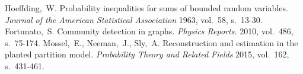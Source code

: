 \documentclass[finnish,12pt,a4paper,pdftex,sci,utf8]{aaltothesis}
\begin{document}

\clearpage

\thesisbibliography

\begin{thebibliography}{99}


 Hoeffding,\ W. Probability inequalities for sums of bounded random variables. \textit{Journal of the American Statistical Association} 1963, vol.\ 58, s.\ 13-30.
 Fortunato,\ S. Community detection in graphs. \textit{Physics Reports.} 2010, vol.\ 486, s.\ 75-174.
 Mossel,\ E., Neeman,\ J., Sly,\ A. Reconstruction and estimation in the planted partition model. \textit{Probability Theory and Related Fields} 2015, vol.\ 162, s.\ 431-461.

\end{thebibliography}

\clearpage

\thesisappendix
\end{document}
